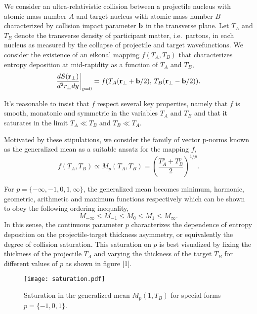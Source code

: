 \documentclass[aps,prl,reprint,amsmath,nofootinbib]{revtex4-1}
\begin{document}
We consider an ultra-relativistic collision between a projectile nucleus with atomic mass number $A$ and target nucleus with atomic mass number $B$ characterized 
by collision impact parameter ${\bf b}$ in the transverse plane. Let $T_A$ and $T_B$ denote the transverse density of participant matter, i.e.\ partons, 
in each nucleus as measured by the collapse of projectile and target wavefunctions. We consider the existence of an eikonal mapping $f(T_A,T_B)$ that 
characterizes entropy deposition at mid-rapidity as a function of $T_A$ and $T_B$,
\begin{equation}
  \label{ansatz}
  \frac{dS({\bf r}_\perp)}{d^2r_\perp dy} \biggr \rvert_{y=0}  = f(T_A({\bf r}_\perp + {\bf b}/2),\,T_B({\bf r}_\perp - {\bf b}/2)).
\end{equation}

It's reasonable to insist that $f$ respect several key properties, namely that $f$ is smooth, monatonic and symmetric in 
the variables $T_A$ and $T_B$ and that it saturates in the limit $T_A \ll T_B$ and $T_B \ll T_A$.

Motivated by these stipulations, we consider the family of vector p-norms known as the generalized mean as a suitable ansatz for the mapping $f$,
\begin{equation}
 \label{generalized mean ansatz}
 f(T_A, T_B) \propto M_p(T_A,T_B) = \left( \frac{T_A^p + T_B^p}{2} \right)^{1/p}.
\end{equation}

For $p = \{-\infty,-1,0,1,\infty\}$, the generalized mean becomes minimum, harmonic, geometric, arithmetic and maximum functions respectively which can be shown
to obey the following ordering inequality, 
\begin{equation}
 M_{-\infty} \le M_{-1} \le M_{0} \le M_{1} \le M_{\infty}.
\end{equation}
In this sense, the continuous parameter $p$ characterizes the dependence of entropy deposition on the projectile-target thickness asymmetry, or equivalently the 
degree of collision saturation. This saturation on $p$ is best visualized by fixing the thickness of the projectile $T_A$ and varying the thickness of the target 
$T_B$ for different values of $p$ as shown in figure [1].
\begin{figure}[b]
 \texttt{[image: saturation.pdf]}
 \caption{Saturation in the generalized mean $M_p(1,T_B)$ for special forms $p=\{-1, 0, 1\}$.}
\end{figure}
\end{document}
